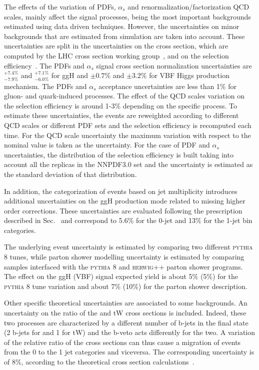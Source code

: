 The effects of the variation of PDFs, $\alpha_s$ and renormalization/factorization QCD scales, mainly affect the signal processes, being the most important backgrounds estimated using data driven techniques. However, the uncertainties on minor backgrounds that are estimated from simulation are taken into account. These uncertainties are split in the uncertainties on the cross section, which are computed by the LHC cross section working group~\cite{YRtmp}, and on the selection efficiency~\cite{Butterworth:2015oua}. The PDFs and $\alpha_{s}$ signal cross section normalization uncertainties are $^{+7.4\%}_{-7.9\%}$ and $^{+7.1\%}_{-6.0\%}$ for ggH and $\pm 0.7\%$ and $\pm 3.2\%$ for VBF Higgs production mechanism. The PDFs and $\alpha_{s}$ acceptance uncertainties are less than 1\% for gluon- and quark-induced processes. The effect of the QCD scales variation on the selection efficiency is around 1-3\% depending on the specific process. To estimate these uncertainties, the events are reweighted according to different QCD scales or different PDF sets and the selection efficiency is recomputed each time. For the QCD scale uncertainty the maximum variation with respect to the nominal value is taken as the uncertainty. For the case of PDF and $\alpha_s$ uncertainties, the distribution of the selection efficiency is built taking into account all the replicas in the NNPDF3.0 set and the uncertainty is estimated as the standard deviation of that distribution.

In addition, the categorization of events based on jet multiplicity introduces additional uncertainties on the ggH production mode related to missing higher order corrections. These uncertainties are evaluated following the prescription described in Sec.~\cite{subsec:stewart-tackman} and correspond to 5.6\% for the 0-jet and 13\% for the 1-jet bin categories.

The underlying event uncertainty is estimated by comparing two different \textsc{pythia 8} tunes,
while parton shower modelling uncertainty is estimated by comparing samples interfaced
with the \textsc{pythia 8} and \textsc{herwig++} parton shower programs. 
The effect on the ggH (VBF) signal expected yield is about 5\% (5\%) for the \textsc{pythia 8} tune variation and about 7\% (10\%) for the parton shower description.

Other specific theoretical uncertainties are associated to some backgrounds. An uncertainty on the ratio of the \ttbar and tW cross sections is included. Indeed, these two processes are characterized by a different number of b-jets in the final state (2 b-jets for \ttbar and 1 for tW) and the b-veto acts differently for the two. A variation of the relative ratio of the cross sections can thus cause a migration of events from the 0 to the 1 jet categories and viceversa. The corresponding uncertainty is of 8\%, according to the theoretical cross section calculations~\cite{topxsec,singletop}.

